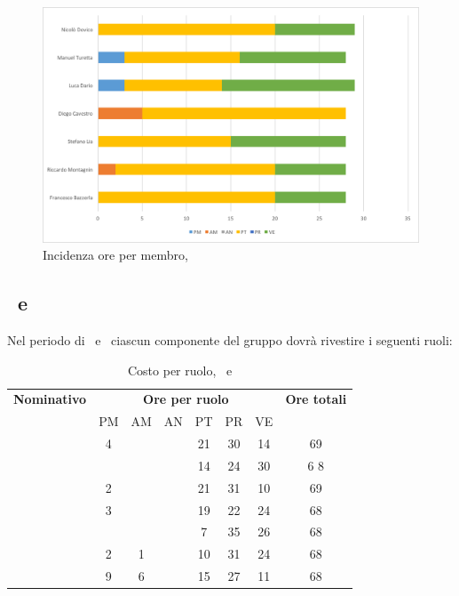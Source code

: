 \begin{figure}[H]
	\centering 
	\includegraphics[scale=0.7]{Immagini/GraficiPianoLavoro/PA.png}
	\caption{Incidenza ore per membro, \PA}
\end{figure}

\newpage
\subsection{\PD\ e \COD}
Nel periodo di \PD\ e \COD\ ciascun componente del gruppo dovrà rivestire i seguenti ruoli:

\begin{table}[h]
	\begin{center}
		\begin{tabular}{|c|c|c|c|c|c|c|c|}
			\hline
			\textbf{Nominativo} & \multicolumn{6}{c|}{\textbf{Ore per ruolo}} & \textbf{Ore totali} \\
					& PM & AM & AN & PT & PR & VE & \\
			\hline
			\FB		& 4  &	  &   & 21	&	30 & 14  &	69	\\
			\hline
			\RM		&	 &	  &	   & 14	&	24 & 30 & 6	8\\
			\hline
			\SL		& 2	 &   &	   & 21	&	31 & 10  &	69	\\
			\hline
			\DC		& 3	 &	  &	   & 19	&	22 & 24 &	68	\\
			\hline
			\LD 	&	 &	  &	   & 7	&	35 & 26  &	68	\\
			\hline
			\MT		& 	2 & 1  &	   & 10	&	31 & 24  &	68	\\
			\hline
			\ND 	& 9 & 6  &	   & 15	&	27 & 11 & 68	\\
			\hline
		\end{tabular}
	\end{center}
	\caption{Costo per ruolo, \PD\ e \COD}
\end{table}

